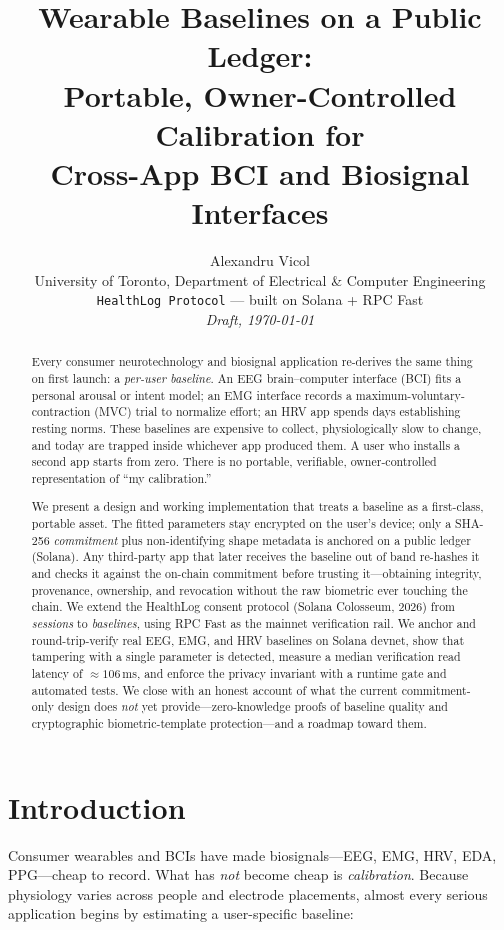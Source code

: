 \documentclass[10pt,twocolumn]{article}
\title{\vspace{-2.5em}\bfseries Wearable Baselines on a Public Ledger:\\
Portable, Owner-Controlled Calibration for\\Cross-App BCI and Biosignal Interfaces}
\author{Alexandru Vicol\\
\small University of Toronto, Department of Electrical \& Computer Engineering\\
\small \texttt{HealthLog Protocol} --- built on Solana + RPC Fast\\
\small \emph{Draft, \today}}
\date{}
\begin{document}
\maketitle

\begin{abstract}
\noindent
Every consumer neurotechnology and biosignal application re-derives the same
thing on first launch: a \emph{per-user baseline}. An EEG brain--computer
interface (BCI) fits a personal arousal or intent model; an EMG interface
records a maximum-voluntary-contraction (MVC) trial to normalize effort; an HRV
app spends days establishing resting norms. These baselines are expensive to
collect, physiologically slow to change, and today are trapped inside whichever
app produced them. A user who installs a second app starts from zero. There is
no portable, verifiable, owner-controlled representation of ``my calibration.''

We present a design and working implementation that treats a baseline as a
first-class, portable asset. The fitted parameters stay encrypted on the user's
device; only a SHA-256 \emph{commitment} plus non-identifying shape metadata is
anchored on a public ledger (Solana). Any third-party app that later receives
the baseline out of band re-hashes it and checks it against the on-chain
commitment before trusting it---obtaining integrity, provenance, ownership, and
revocation without the raw biometric ever touching the chain. We extend the
HealthLog consent protocol (Solana Colosseum, 2026) from \emph{sessions} to
\emph{baselines}, using RPC Fast as the mainnet verification rail. We anchor and
round-trip-verify real EEG, EMG, and HRV baselines on Solana devnet, show that
tampering with a single parameter is detected, measure a median verification
read latency of $\approx\!106$\,ms, and enforce the privacy invariant with a
runtime gate and automated tests. We close with an honest account of what the
current commitment-only design does \emph{not} yet provide---zero-knowledge
proofs of baseline quality and cryptographic biometric-template protection---and
a roadmap toward them.
\end{abstract}

\section{Introduction}

Consumer wearables and BCIs have made biosignals---EEG, EMG, HRV, EDA,
PPG---cheap to record. What has \emph{not} become cheap is \emph{calibration}.
Because physiology varies across people and electrode placements, almost every
serious application begins by estimating a user-specific baseline:
\end{document}
